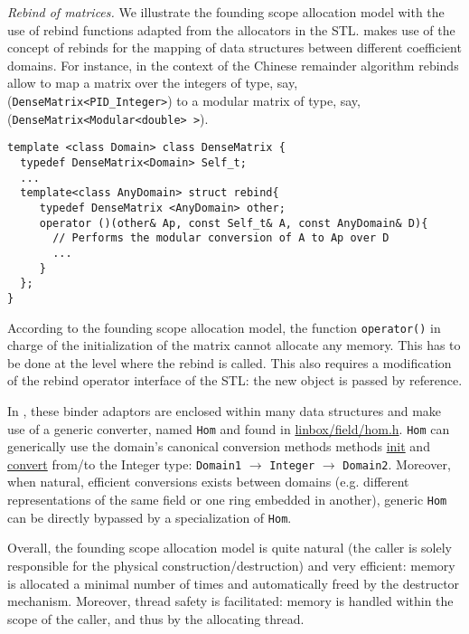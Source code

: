 {\em Rebind of matrices.}
We illustrate the founding scope allocation model with the use of rebind
functions adapted from the allocators in the STL.
\linbox makes use of the concept of rebinds for the mapping of data
structures between different coefficient domains.
For instance, in the context of the Chinese remainder algorithm rebinds
allow to map a matrix over the integers of type, say,
(\texttt{DenseMatrix<PID\_Integer>}) to a modular matrix of type, say,
\\(\texttt{DenseMatrix<Modular<double> >}).
\begin{verbatim}
template <class Domain> class DenseMatrix {
  typedef DenseMatrix<Domain> Self_t;
  ... 
  template<class AnyDomain> struct rebind{ 
     typedef DenseMatrix <AnyDomain> other;
     operator ()(other& Ap, const Self_t& A, const AnyDomain& D){
       // Performs the modular conversion of A to Ap over D
       ...
     } 
  };  
}
\end{verbatim}
According to the founding scope allocation model, the function
\texttt{operator()} in charge of the initialization of the matrix cannot 
allocate any memory. This has to be done at the level where the
rebind is called. This also requires a modification of the rebind
operator interface of the STL: the new object is passed by reference.

In \linbox, these binder adaptors are enclosed
within many data structures and make use of a generic
converter, named \texttt{Hom} and found in \url{linbox/field/hom.h}.
\texttt{Hom} can generically use the \linbox domain's canonical
conversion methods methods \url{init} and \url{convert} from/to the \linbox
Integer type: \texttt{Domain1} $\rightarrow$ \texttt{Integer}
$\rightarrow$ \texttt{Domain2}. 
Moreover, when natural, efficient conversions exists between domains
(e.g. different representations of the same field or one ring embedded in another), generic \texttt{Hom} can be directly bypassed by a specialization of \texttt{Hom}.

Overall, the founding scope allocation model is quite natural (the caller is
solely responsible for the physical construction/destruction) and very
efficient: memory is allocated a minimal number of times and
automatically freed by the destructor mechanism. Moreover, thread
safety is facilitated: memory is handled within the scope of the
caller, and thus by the allocating thread. %

